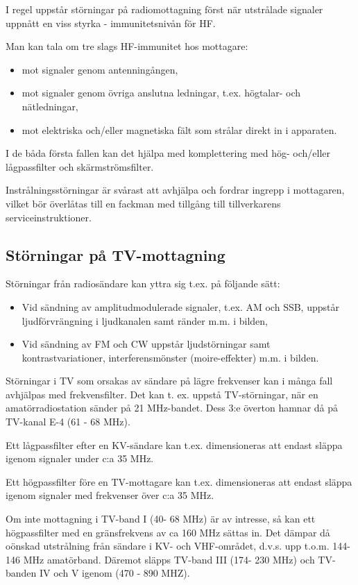 I regel uppstår störningar på radiomottagning först när utstrålade
signaler uppnått en viss styrka - immunitetsnivån för HF.

Man kan tala om tre slags HF-immunitet hos mottagare:
\begin{itemize}
\item mot signaler genom antenningången,
\item mot signaler genom övriga anslutna ledningar, t.ex. högtalar-
  och nätledningar,
\item mot elektriska och/eller magnetiska fält som strålar direkt in i
  apparaten.
\end{itemize}

I de båda första fallen kan det hjälpa med komplettering med hög-
och/eller lågpassfilter och skärmströmsfilter.

Instrålningsstörningar är svårast att avhjälpa och fordrar ingrepp i
mottagaren, vilket bör överlåtas till en fackman med tillgång till
tillverkarens serviceinstruktioner.

\subsection{Störningar på TV-mottagning}


Störningar från radiosändare kan yttra sig t.ex. på följande sätt:
\begin{itemize}
\item Vid sändning av amplitudmodulerade signaler, t.ex. AM och SSB,
  uppstår ljudförvrängning i ljudkanalen samt ränder m.m. i bilden,
\item Vid sändning av FM och CW uppstår ljudstörningar samt
  kontrastvariationer, interferensmönster (moire-effekter) m.m. i
  bilden.
\end{itemize}

Störningar i TV som orsakas av sändare på lägre frekvenser kan i många
fall avhjälpas med frekvensfilter. Det kan t. ex. uppstå
TV-störningar, när en amatörradiostation sänder på 21 MHz-bandet. Dess
3:e överton hamnar då på TV-kanal E-4 (61 - 68 MHz).

Ett lågpassfilter efter en KV-sändare kan t.ex. dimensioneras att
endast släppa igenom signaler under c:a 35 MHz.

Ett högpassfilter före en TV-mottagare kan t.ex. dimensioneras att
endast släppa igenom signaler med frekvenser över c:a 35 MHz.

Om inte mottagning i TV-band I (40- 68 MHz) är av intresse, så kan ett
högpassfilter med en gränsfrekvens av ca 160 MHz sättas in. Det dämpar
då oönskad utstrålning från sändare i KV- och VHF-området, d.v.s. upp
t.o.m. 144-146 MHz amatörband. Däremot släpps TV-band III (174- 230
MHz) och TV-banden IV och V igenom (470 - 890 MHZ).

